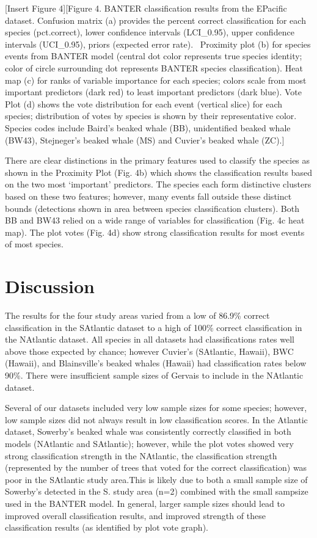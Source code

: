 \documentclass[
  letterpaper,
  DIV=11,
  numbers=noendperiod]{scrartcl}
\begin{document}
{[}Insert Figure 4{]}{[}Figure 4. BANTER classification results from the
EPacific dataset. Confusion matrix (a) provides the percent correct
classification for each species (pct.correct), lower confidence
intervals (LCI\_0.95), upper confidence intervals (UCI\_0.95), priors
(expected error rate).~ Proximity plot (b) for species events from
BANTER model (central dot color represents true species identity; color
of circle surrounding dot represents BANTER species classification).
Heat map (c) for ranks of variable importance for each species; colors
scale from most important predictors (dark red) to least important
predictors (dark blue). Vote Plot (d) shows the vote distribution for
each event (vertical slice) for each species; distribution of votes by
species is shown by their representative color. Species codes include
Baird's beaked whale (BB), unidentified beaked whale (BW43), Stejneger's
beaked whale (MS) and Cuvier's beaked whale (ZC).{]}

There are clear distinctions in the primary features used to classify
the species as shown in the Proximity Plot (Fig. 4b) which shows the
classification results based on the two most `important' predictors. The
species each form distinctive clusters based on these two features;
however, many events fall outside these distinct bounds (detections
shown in area between species classification clusters). Both BB and BW43
relied on a wide range of variables for classification (Fig. 4c heat
map). The plot votes (Fig. 4d) show strong classification results for
most events of most species.

\hypertarget{discussion}{%
\section{Discussion}\label{discussion}}

The results for the four study areas varied from a low of 86.9\% correct
classification in the SAtlantic dataset to a high of 100\% correct
classification in the NAtlantic dataset. All species in all datasets had
classifications rates well above those expected by chance; however
Cuvier's (SAtlantic, Hawaii), BWC (Hawaii), and Blainsville's beaked
whales (Hawaii) had classification rates below 90\%. There were
insufficient sample sizes of Gervais to include in the NAtlantic
dataset.

Several of our datasets included very low sample sizes for some species;
however, low sample sizes did not always result in low classification
scores. In the Atlantic dataset, Sowerby's beaked whale was consistently
correctly classified in both models (NAtlantic and SAtlantic); however,
while the plot votes showed very strong classification strength in the
NAtlantic, the classification strength (represented by the number of
trees that voted for the correct classification) was poor in the
SAtlantic study area.This is likely due to both a small sample size of
Sowerby's detected in the S. study area (n=2) combined with the small
sampsize used in the BANTER model. In general, larger sample sizes
should lead to improved overall classification results, and improved
strength of these classification results (as identified by plot vote
graph).
\end{document}
